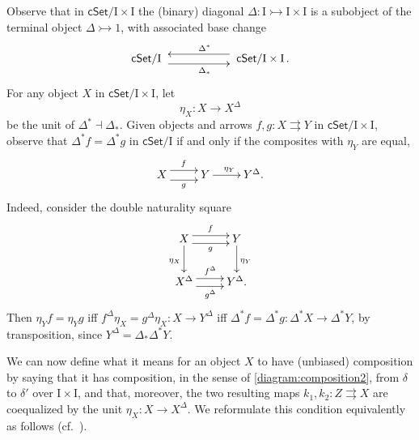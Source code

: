 \documentclass[12pt]{article}
\newcommand{\cSet}{\ensuremath{\mathsf{cSet}}}
\newcommand{\mono}{\ensuremath{\rightarrowtail}}
\newcommand{\ra}{\ensuremath{\rightarrow}}
\newcommand{\I}{\ensuremath{\mathrm{I}}}
\theoremstyle{remark}
\theoremstyle{definition}
\begin{document}
Observe that in $\cSet/\I\times\I$ the (binary) diagonal $\Delta : \I\mono \I\times\I$ is a subobject of the terminal object $\Delta\mono 1$, with associated base change 
\begin{equation}\label{diagram:Deltabasechange}
\xymatrix{
\cSet/\I\ \ar@<-1ex>[rr]_{\Delta_*}  && \ar@<-1ex>[ll]_{\Delta^*} \ \cSet/\I\times\I \,.
}
\end{equation}
%
For any object $X$ in $\cSet/\I\times\I$, let $$\eta_X : X\ra X^\Delta$$ be the unit of $\Delta^*\dashv \Delta_*$.  
Given objects and arrows $f, g : X \rightrightarrows Y$ in $\cSet/\I\times\I$, observe that
 $\Delta^*f = \Delta^*g$ in $\cSet/\I$ if and only if the composites with $\eta_Y$ are equal,
\begin{equation}\label{diagram:composeDelta}
\xymatrix{
X \ar@<-1ex>[r]_{g}  \ar@<1ex>[r]^{f} & Y \ar[r]^{\eta_Y} & Y^\Delta.
}
\end{equation}
%
Indeed, consider the double naturality square
\begin{equation}\label{diagram:Deltanatural}
\xymatrix{
X \ar[d]_{\eta_X} \ar@<-.8ex>[r]_{g}  \ar@<.8ex>[r]^{f} & Y \ar[d]^{\eta_Y} \\
X^\Delta \ar@<-.8ex>[r]_{g^\Delta}  \ar@<.8ex>[r]^{f^\Delta} & Y^\Delta.
}
\end{equation}
Then $\eta_Y f = \eta_Y g$ iff $f^\Delta \eta_X= g^\Delta \eta_X : X\ra Y^\Delta$ iff $\Delta^*f = \Delta^*g : \Delta^*X \ra\Delta^*Y$, by transposition, since $Y^\Delta = \Delta_*\Delta^* Y$. 

We can now define what it means for an object $X$ to have (unbiased) composition by saying that it has composition, in the sense of \eqref{diagram:composition2}, from $\delta$ to $\delta'$ over $\I\times \I$, and that, moreover, the two resulting maps $k_1, k_2 : Z\rightrightarrows X$ are coequalized by the unit $\eta_X : X\ra X^\Delta$.  We reformulate this condition equivalently as follows (cf.\ \cite{Coquand,ABCetc.}).
\end{document}
